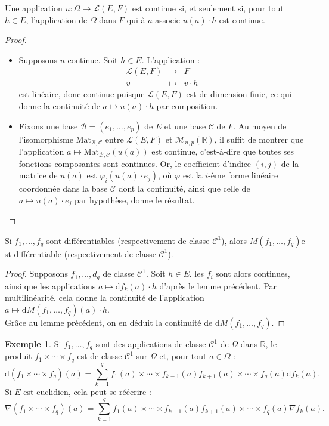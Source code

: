 \documentclass[french]{article}
\newcommand{\R}{\mathbb{R}}
\renewcommand{\d}{\text{d}}
\theoremstyle{plain}
\theoremstyle{definition}
\newtheorem*{ex}{Exemple}
\theoremstyle{remark}
\begin{document}
\begin{lem}%
	Une application $u:\Omega\to\mathcal{L}(E,F)$ est continue si, et seulement si, pour tout $h\in E$, l'application de $\Omega$ dans $F$ qui à $a$ associe $u(a)\cdot h$ est continue.
\end{lem}
\begin{proof}
	\begin{itemize}
		\item Supposons $u$ continue. Soit $h\in E$. L'application :
		$$\begin{array}{rcl}
			\mathcal{L}(E,F)&\longrightarrow&F\\
			v&\longmapsto&v\cdot h
		\end{array}$$ est linéaire, donc continue puisque $\mathcal{L}(E,F)$ est de dimension finie, ce qui donne la continuité de $a\mapsto u(a)\cdot h$ par composition.
		\item Fixons une base $\mathcal{B}=(e_1,\ldots,e_p)$ de $E$ et une base $\mathcal{C}$ de $F$. Au moyen de l'isomorphisme $\text{Mat}_{\mathcal{B},\mathcal{C}}$ entre $\mathcal{L}(E,F)$ et $\mathcal{M}_{n,p}(\R)$, il suffit de montrer que l'application $a\mapsto\text{Mat}_{\mathcal{B},\mathcal{C}}(u(a))$ est continue, c'est-à-dire que toutes ses fonctions composantes sont continues. Or, le coefficient d'indice $(i,j)$ de la matrice de $u(a)$ est $\varphi_i(u(a)\cdot e_j)$, où $\varphi$ est la $i$-ème forme linéaire coordonnée dans la base $\mathcal{C}$ dont la continuité, ainsi que celle de $a\mapsto u(a)\cdot e_j$ par hypothèse, donne le résultat.
	\end{itemize}
\end{proof}

\begin{cor}%
	Si $f_1,\ldots,f_q$ sont différentiables (respectivement de classe $\mathcal{C}^1$), alors $M(f_1,\ldots,f_q)$e st différentiable (respectivement de classe $\mathcal{C}^1$).
\end{cor}
\begin{proof}
	Supposons $f_1,\ldots,d_q$ de classe $\mathcal{C}^1$. Soit $h\in E$. les $f_i$ sont alors continues, ainsi que les applications $a\mapsto \d f_k(a)\cdot h$ d'après le lemme précédent. Par multilinéarité, cela donne la continuité de l'application $a\mapsto \d M(f_1,\ldots,f_q)(a)\cdot h$.\\
	Grâce au lemme précédent, on en déduit la continuité de $\d M(f_1,\ldots,f_q)$.
\end{proof}

\begin{ex}
	Si $f_1,\ldots,f_q$ sont des applications de classe $\mathcal{C}^1$ de $\Omega$ dans $\R$, le produit $f_1\times\cdots\times f_q$ est de classe $\mathcal{C}^1$ sur $\Omega$ et, pour tout $a\in\Omega$ :
	$$\d(f_1\times\cdots\times f_q)(a)=\sum_{k=1}^{q}f_1(a)\times\cdots\times f_{k-1}(a)f_{k+1}(a)\times\cdots\times f_q(a)\d f_k(a).$$
	Si $E$ est euclidien, cela peut se réécrire :
	$$\nabla(f_1\times\cdots\times f_q)(a)=\sum_{k=1}^{q}f_1(a)\times\cdots\times f_{k-1}(a)f_{k+1}(a)\times\cdots\times f_q(a)\nabla f_k(a).$$
\end{ex}
\end{document}
